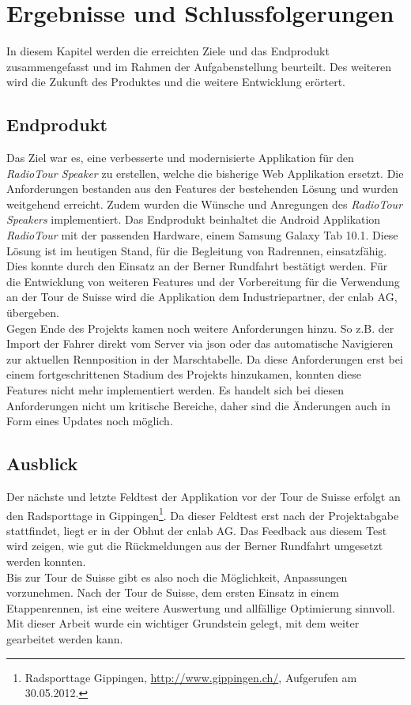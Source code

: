 \chapter{Ergebnisse und Schlussfolgerungen}
In diesem Kapitel werden die erreichten Ziele und das Endprodukt zusammengefasst und im Rahmen der Aufgabenstellung beurteilt. Des weiteren wird die Zukunft des Produktes und die weitere Entwicklung erörtert.

\section{Endprodukt}
Das Ziel war es, eine verbesserte und modernisierte Applikation für den \textit{RadioTour Speaker} zu erstellen, welche die bisherige Web Applikation ersetzt. Die Anforderungen bestanden aus den Features der bestehenden Lösung und wurden weitgehend erreicht. Zudem wurden die Wünsche und Anregungen des \textit{RadioTour Speakers} implementiert. Das Endprodukt beinhaltet die Android Applikation \textit{RadioTour} mit der passenden Hardware, einem Samsung Galaxy Tab 10.1. Diese Lösung ist im heutigen Stand, für die Begleitung von  Radrennen, einsatzfähig. Dies konnte durch den Einsatz an der Berner Rundfahrt bestätigt werden. Für die Entwicklung von weiteren Features und der Vorbereitung für die Verwendung an der Tour de Suisse wird die Applikation dem Industriepartner, der cnlab AG, übergeben.
\\

Gegen Ende des Projekts kamen noch weitere Anforderungen hinzu. 
So z.B. der Import der Fahrer direkt vom Server via \gls{json} oder das automatische Navigieren zur aktuellen Rennposition in der Marschtabelle. Da diese Anforderungen erst bei einem fortgeschrittenen Stadium des Projekts hinzukamen, konnten diese Features nicht mehr implementiert werden. Es handelt sich bei diesen Anforderungen nicht um kritische Bereiche, daher sind die Änderungen auch in Form eines Updates noch möglich.

\section{Ausblick}
Der nächste und letzte Feldtest der Applikation vor der Tour de Suisse erfolgt an den Radsporttage in Gippingen\footnote{Radsporttage Gippingen, \url{http://www.gippingen.ch/}, Aufgerufen am 30.05.2012.}. Da dieser Feldtest erst nach der Projektabgabe stattfindet, liegt er in der Obhut der cnlab AG. Das Feedback aus diesem Test wird zeigen, wie gut die Rückmeldungen aus der Berner Rundfahrt umgesetzt werden konnten.
\\

Bis zur Tour de Suisse gibt es also noch die Möglichkeit, Anpassungen vorzunehmen. Nach der Tour de Suisse, dem ersten Einsatz in einem Etappenrennen, ist eine weitere Auswertung und allfällige Optimierung sinnvoll. Mit dieser Arbeit wurde ein wichtiger Grundstein gelegt, mit dem weiter gearbeitet werden kann.